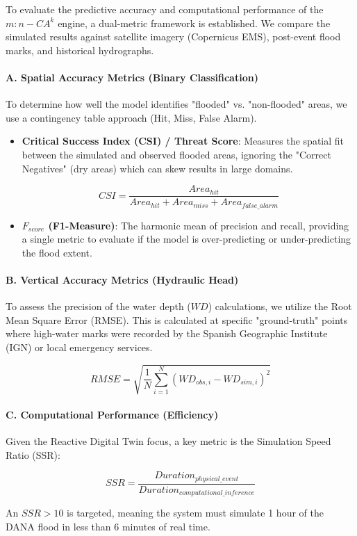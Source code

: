To evaluate the predictive accuracy and computational performance of the $m:n-CA^k$ engine, a dual-metric framework is established. We 
compare the simulated results against satellite imagery (Copernicus EMS), post-event flood marks, and historical hydrographs.

\paragraph{A. Spatial Accuracy Metrics (Binary Classification)}

To determine how well the model identifies "flooded" vs. "non-flooded" areas, we use a contingency table approach (Hit, Miss, False 
Alarm).

\begin{itemize}
    \item \textbf{Critical Success Index (CSI) / Threat Score}: Measures the spatial fit between the simulated and observed flooded areas, ignoring the "Correct Negatives" (dry areas) which can skew results in large domains.

    $$CSI = \frac{Area_{hit}}{Area_{hit} + Area_{miss} + Area_{false\_alarm}}$$

    \item \textbf{$F_{score}$ (F1-Measure)}: The harmonic mean of precision and recall, providing a single metric to evaluate if the model is over-predicting or under-predicting the flood extent.
\end{itemize}

\paragraph{B. Vertical Accuracy Metrics (Hydraulic Head)}

To assess the precision of the water depth ($WD$) calculations, we utilize the Root Mean Square Error (RMSE). This is calculated at 
specific "ground-truth" points where high-water marks were recorded by the Spanish Geographic Institute (IGN) or local emergency 
services.

$$RMSE = \sqrt{\frac{1}{N} \sum_{i=1}^{N} (WD_{obs,i} - WD_{sim,i})^2}$$

\paragraph{C. Computational Performance (Efficiency)}

Given the Reactive Digital Twin focus, a key metric is the Simulation Speed Ratio (SSR):

$$SSR = \frac{Duration_{physical\_event}}{Duration_{computational\_inference}}$$

An $SSR > 10$ is targeted, meaning the system must simulate 1 hour of the DANA flood in less than 6 minutes of real time.
